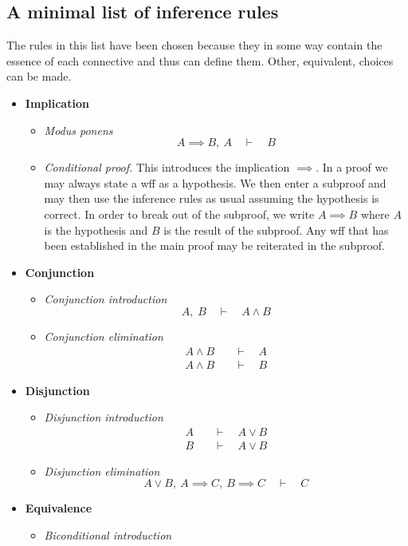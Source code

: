 \subsection{A minimal list of inference rules}
The rules in this list have been chosen because they in some way contain the essence of each connective and thus can define them. Other, equivalent, choices can be made.
\begin{itemize}
\item \textbf{Implication}
\begin{itemize}
\item \textit{Modus ponens} \[ A \implies B, \  A \quad\vdash\quad B \]
\item \textit{Conditional proof.} This introduces the implication $\implies$. In a proof we may always state a wff as a hypothesis. We then enter a subproof and may then use the inference rules as usual assuming the hypothesis is correct. In order to break out of the subproof, we write $A \implies B$ where $A$ is the hypothesis and $B$ is the result of the subproof. Any wff that has been established in the main proof may be reiterated in the subproof.
\end{itemize}
\item \textbf{Conjunction}
\begin{itemize}
\item \textit{Conjunction introduction}\[ A, \; B \quad\vdash\quad A \land B \]
\item \textit{Conjunction elimination}
\begin{align*}
A \land B \quad&\vdash\quad A \\
A \land B \quad&\vdash\quad B
\end{align*}
\end{itemize}
\item \textbf{Disjunction}
\begin{itemize}
\item \textit{Disjunction introduction}
\begin{align*}
A \quad&\vdash\quad A\lor B \\
B \quad&\vdash\quad A \lor B
\end{align*}
\item \textit{Disjunction elimination}
\[ A \lor B, \  A \implies C, \  B \implies C \quad\vdash\quad C \]
\end{itemize}
\item \textbf{Equivalence}
\begin{itemize}
\item \textit{Biconditional introduction}

\end{itemize}
\end{itemize}
